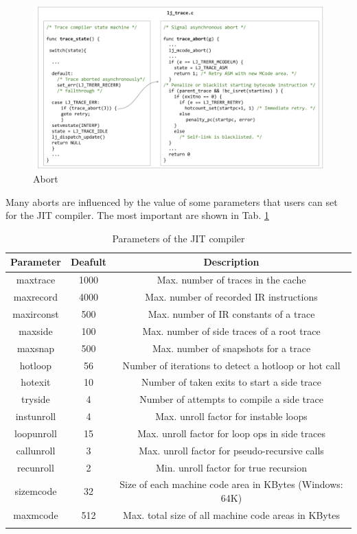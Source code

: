 \begin{figure}[H]
    \centering
	\includegraphics[width=\textwidth]{images/chapter7/abort.png}
    \caption{Abort}
    \label{fig:abort-mechanism}
\end{figure}


\noindent
Many aborts are influenced by the value of some parameters that users can set for the JIT compiler. The most important are shown in Tab. \ref{tab:parameters-jit}

\begin{center}
\begin{longtable}{|c|c|c|}
\hline
\textbf{Parameter} & \textbf{Deafult} & \textbf{Description}\\
\hline
maxtrace & 1000	 & Max. number of traces in the cache\\
maxrecord	 & 4000	 & Max. number of recorded IR instructions\\
maxirconst & 	500	   & Max. number of IR constants of a trace\\
maxside	 & 100	    & Max. number of side traces of a root trace\\
maxsnap & 	500	    & Max. number of snapshots for a trace\\
hotloop	 & 56	    & Number of iterations to detect a hotloop or hot call\\
hotexit	 & 10	    & Number of taken exits to start a side trace\\
tryside	 & 4	     & Number of attempts to compile a side trace\\
instunroll	 & 4	 & Max. unroll factor for instable loops\\
loopunroll & 	15   & Max. unroll factor for loop ops in side traces\\
callunroll	 & 3	 & Max. unroll factor for pseudo-recursive calls\\
recunroll	 & 2	 & Min. unroll factor for true recursion\\
sizemcode	 & 32	 & Size of each machine code area in KBytes (Windows: 64K)\\
maxmcode	 & 512	 & Max. total size of all machine code areas in KBytes\\
\hline
\caption{Parameters of the JIT compiler}
\label{tab:parameters-jit}
\end{longtable}
\end{center}


